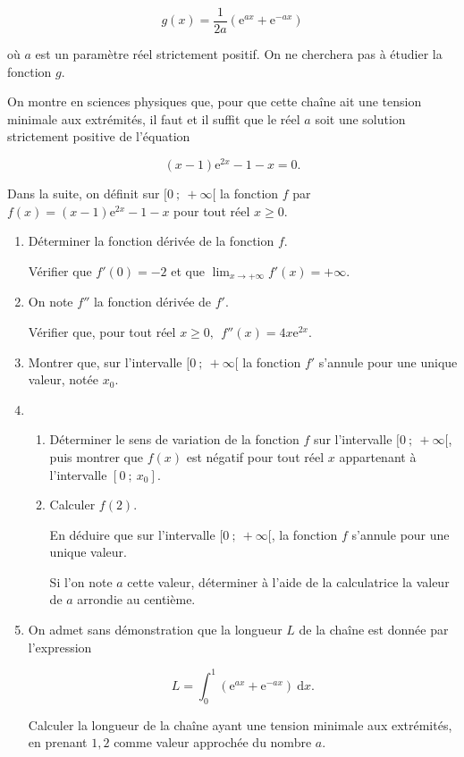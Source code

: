 \documentclass[10pt]{article}
\begin{document}
\[g(x) = \dfrac{1}{2a} \left(\text{e}^{ax} +  \text{e}^{- ax}\right)\]

où $a$ est   un paramètre réel strictement positif. On ne cherchera pas à étudier la fonction $g$. 

\smallskip

On montre en sciences physiques que, pour que cette chaîne ait une tension minimale aux extrémités,  il faut et il suffit que le réel $a$ soit une solution strictement positive de l'équation 

\[(x - 1)\text{e}^{2x} - 1 - x = 0.\]
 
Dans la suite, on définit sur $[0~;~+ \infty[$ 
la fonction $f$ par $f(x) = (x - 1)\text{e}^{2x} - 1 - x$ pour tout réel $x \geqslant 0$. 

\medskip

\begin{enumerate}
\item Déterminer la fonction dérivée de la fonction $f$.

Vérifier que $f'(0) = - 2$ et que $\displaystyle\lim_{x \to + \infty} f'(x) = + \infty$. 
\item  On note $f''$ la fonction dérivée de $f'$.
 
Vérifier que, pour tout réel $x \geqslant 0,\:\: f''(x) = 4x\text{e}^{2x}$. 
\item Montrer que, sur l'intervalle $[0~;~+ \infty[$ la fonction $f'$ s'annule pour une unique valeur, notée $x_{0}$. 
\item
	\begin{enumerate}
		\item Déterminer le sens de variation de la fonction $f$ sur l'intervalle $[0~;~+ \infty[$, puis montrer que $f(x)$ est négatif pour tout réel $x$ appartenant à l'intervalle $\left[0~;~x_{0}\right]$. 
		\item  Calculer $f(2)$.

En déduire que sur l'intervalle $[0~;~+ \infty[$, la fonction $f$ s'annule pour une unique valeur.

Si l'on note $a$ cette valeur, déterminer à l'aide de la calculatrice la valeur de $a$ arrondie au centième. 		
	\end{enumerate} 
\item On admet sans démonstration que la longueur $L$ de la chaîne est donnée par l'expression
 
\[L = \displaystyle\int_{0}^1 \left(\text{e}^{ax} +  \text{e}^{- ax}\right)\:\text{d}x.\] 

Calculer la longueur de la chaîne ayant une tension minimale aux extrémités, en prenant $1,2$ comme valeur  approchée du nombre $a$. 
\end{enumerate}
\end{document}
